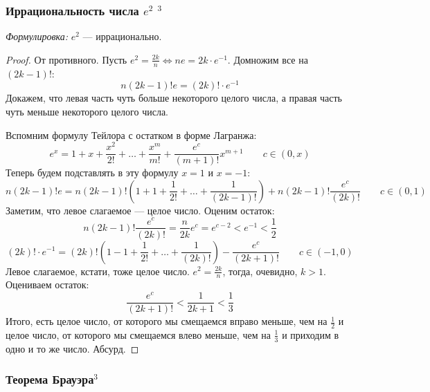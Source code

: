 \documentclass{article}
\begin{document}
\subsubsection{Иррациональность числа $e^2$ \texorpdfstring{$^3$}{}}
\textit{Формулировка: }
$e^2$ --- иррационально.
\begin{proof}
От противного. Пусть $e^2 = \frac{2k} {n} \Leftrightarrow ne = 2k\cdot e^{-1}$. Домножим все на $(2k-1)!$:
\begin{equation*}
n(2k-1)!e = (2k)!\cdot e^{-1}
\end{equation*}
Докажем, что левая часть чуть больше некоторого целого числа, а правая часть чуть меньше некоторого целого числа.

Вспомним формулу Тейлора с остатком в форме Лагранжа:
\begin{equation*}
e^x = 1 + x + \frac{x^2} {2!} + \dots + \frac{x^m} {m!} + \frac{e^c} {(m+1)!} x^{m+1} \qquad c \in (0, x)
\end{equation*}
Теперь будем подставлять в эту формулу $x = 1$ и $x = -1$:
\begin{equation*}
n(2k-1)!e = n(2k-1)!\left(1 + 1 + \frac{1} {2!} + \dots + \frac{1} {(2k - 1)!}\right) + n(2k-1)!\frac{e^c} {(2k)!}\qquad c \in (0, 1)
\end{equation*}
Заметим, что левое слагаемое --- целое число. Оценим остаток:
\begin{equation*}
n(2k-1)!\frac{e^c} {(2k)!} = \frac{n}{2k}e^c = e^{c-2} < e^{-1} < \frac{1} {2}
\end{equation*}
\begin{equation*}
(2k)!\cdot e^{-1} = (2k)!\left(1 -1 + \frac{1} {2!} +  \dots + \frac{1} {(2k)!}\right) - \frac{e^c} {(2k + 1)!} \qquad c \in (-1, 0)
\end{equation*}
Левое слагаемое, кстати, тоже целое число. $e^2 = \frac{2k} {n}$, тогда, очевидно, $k>1$. Оцениваем остаток:
\begin{equation*}
\frac{e^c} {(2k + 1)!} < \frac{1} {2k + 1} < \frac{1} {3}
\end{equation*}
Итого, есть целое число, от которого мы смещаемся вправо меньше, чем на $\frac{1} {2}$ и целое число, от которого мы смещаемся влево меньше, чем на $\frac{1} {3}$ и приходим в одно и то же число. Абсурд.
\end{proof}

\subsubsection{Теорема Брауэра\texorpdfstring{$^3$}{}}
\end{document}
